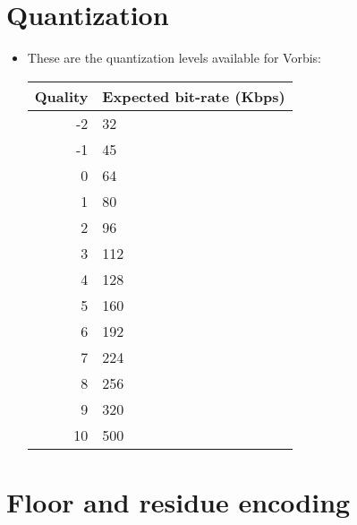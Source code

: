 

\section{Quantization}

\begin{itemize}
\item These are the quantization levels available for Vorbis:
  \begin{center}
    \begin{tabular}{r|l}
      Quality & Expected bit-rate (Kbps) \\
      \hline
      -2 & 32 \\
      -1 & 45 \\
      0 & 64 \\
      1 & 80 \\
      2 & 96 \\
      3 & 112 \\
      4 & 128 \\
      5 & 160 \\
      6 & 192 \\
      7 & 224 \\
      8 & 256 \\
      9 & 320 \\
      10 & 500
    \end{tabular}
  \end{center}
\end{itemize}


\section{Floor and residue encoding}

